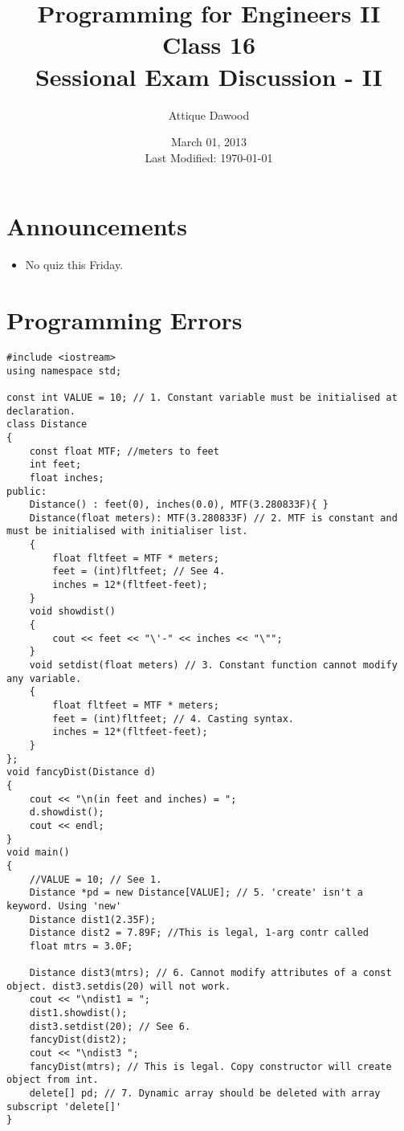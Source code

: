 \documentclass[12pt,a4paper]{article}
\title{\vspace{-2cm}Programming for Engineers II\\Class 16\\Sessional Exam Discussion - II}
\author{Attique Dawood}
\date{March 01, 2013\\[0.2cm] Last Modified: \today}
\begin{document}
\maketitle
\section{Announcements}
\begin{itemize}
\item No quiz this Friday.
\end{itemize}
\section{Programming Errors}
\begin{lstlisting}
#include <iostream>
using namespace std;

const int VALUE = 10; // 1. Constant variable must be initialised at declaration.
class Distance
{
	const float MTF; //meters to feet
	int feet;
	float inches;
public:
	Distance() : feet(0), inches(0.0), MTF(3.280833F){ }
	Distance(float meters): MTF(3.280833F) // 2. MTF is constant and must be initialised with initialiser list.
	{
		float fltfeet = MTF * meters;
		feet = (int)fltfeet; // See 4.
		inches = 12*(fltfeet-feet);
	}
	void showdist()
	{
		cout << feet << "\'-" << inches << "\"";
	}
	void setdist(float meters) // 3. Constant function cannot modify any variable.
	{
		float fltfeet = MTF * meters;
		feet = (int)fltfeet; // 4. Casting syntax.
		inches = 12*(fltfeet-feet);
	}
};
void fancyDist(Distance d)
{
	cout << "\n(in feet and inches) = ";
	d.showdist();
	cout << endl;
}
void main()
{
	//VALUE = 10; // See 1.
	Distance *pd = new Distance[VALUE]; // 5. 'create' isn't a keyword. Using 'new'
	Distance dist1(2.35F); 
	Distance dist2 = 7.89F;	//This is legal, 1-arg contr called
	float mtrs = 3.0F;

	Distance dist3(mtrs); // 6. Cannot modify attributes of a const object. dist3.setdis(20) will not work.
	cout << "\ndist1 = ";
	dist1.showdist();
	dist3.setdist(20); // See 6.
	fancyDist(dist2);
	cout << "\ndist3 ";
	fancyDist(mtrs); // This is legal. Copy constructor will create object from int.
	delete[] pd; // 7. Dynamic array should be deleted with array subscript 'delete[]'
}
\end{lstlisting}


\end{document}
